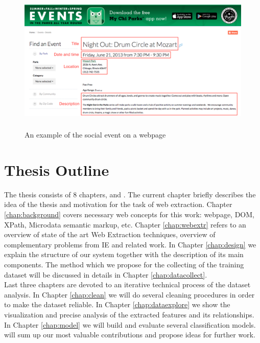 \begin{figure}[h]
\begin{center}
\includegraphics[height=7cm]{figures01/event_example}
\caption{An example of the social event on a webpage}
\label{fig:webevent}
\end{center}
\end{figure}


\section{Thesis Outline}
The thesis consists of 8 chapters,  and . The current chapter briefly describes the idea of the thesis and motivation for the task of web extraction. Chapter \ref{chap:background} covers necessary web concepts for this work: webpage, DOM, XPath, Microdata semantic markup, etc. Chapter \ref{chap:webextr} refers to an overview of state of the art Web Extraction techniques, overview of complementary problems from IE and related work. In Chapter \ref{chap:design} we explain the structure of our system together with the description of its main components. The method which we propose for the collecting of the training dataset will be discussed in details in Chapter \ref{chap:datacollect}. \\

Last three chapters are devoted to an iterative technical process of the dataset analysis. In Chapter \ref{chap:clean} we will do several cleaning procedures in order to make the dataset reliable. In Chapter \ref{chap:dataexplore} we show the visualization and precise analysis of the extracted features and its relationships. In Chapter \ref{chap:model} we will build  and evaluate several classification models.  will sum up our most valuable contributions and propose ideas for further work.